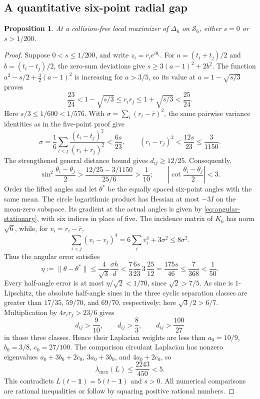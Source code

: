 \documentclass[11pt]{article}
\newtheorem{proposition}[theorem]{Proposition}
\theoremstyle{remark}
\newcommand{\one}{\mathbf 1}
\newcommand{\norm}[1]{\lVert#1\rVert}
\numberwithin{equation}{section}
\begin{document}
\subsection{A quantitative six-point radial gap}
\begin{proposition}\label{prop:six-gap}
At a collision-free local maximizer of $\Delta_6$ on $\mathcal S_6$,
either $s=0$ or $s>1/200$.
\end{proposition}
\begin{proof}
Suppose $0<s\le1/200$, and write $z_i=r_i e^{i\theta_i}$.
For $a=(t_i+t_j)/2$ and $b=(t_i-t_j)/2$, the zero-sum deviations give
$s\ge3(a-1)^2+2b^2$.
The function $a^2-s/2+\frac32(a-1)^2$ is increasing for $a>3/5$,
so its value at $a=1-\sqrt{s/3}$ proves
\[
 \frac{23}{24}<1-\sqrt{s/3}\le r_ir_j
 \le1+\sqrt{s/3}<\frac{25}{24}.
\]
Here $s/3\le1/600<1/576$.
With $\sigma=\sum_i(r_i-\overline r)^2$, the same pairwise variance
identities as in the five-point proof give
\[
 \sigma=\frac16\sum_{i<j}
       \frac{(t_i-t_j)^2}{(r_i+r_j)^2}<\frac{6s}{23},
 \qquad (r_i-r_j)^2<\frac{12s}{23}\le\frac3{1150}.
\]
The strengthened general distance bound gives $d_{ij}\ge12/25$.
Consequently,
\[
 \sin^2\frac{\theta_i-\theta_j}{2}
 >\frac{12/25-3/1150}{25/6}>\frac1{10};
 \qquad \left|\cot\frac{\theta_i-\theta_j}{2}\right|<3.
\]
Order the lifted angles and let $\theta^*$ be the equally spaced
six-point angles with the same mean. The circle logarithmic product
has Hessian at most $-3I$ on the mean-zero subspace. Its gradient
at the actual angles is given by \eqref{eq:angular-stationary}, with
six indices in place of five. The incidence matrix of $K_6$ has norm
$\sqrt6$, while, for $v_i=r_i-\overline r$,
\[
 \sum_{i<j}(v_i-v_j)^4
 =6\sum_i v_i^4+3\sigma^2\le8\sigma^2.
\]
Thus the angular error satisfies
\[
 \eta:=\norm{\theta-\theta^*}
 \le\frac4{\sqrt3}\frac{\sigma h}{d}
 <\frac73\frac{6s}{23}\,3\,\frac{25}{12}
 =\frac{175s}{46}\le\frac7{368}<\frac1{50}.
\]
Every half-angle error is at most $\eta/\sqrt2<1/70$, since
$\sqrt2>7/5$.
As sine is $1$-Lipschitz, the absolute half-angle sines in the three
cyclic separation classes are greater than $17/35$, $59/70$, and
$69/70$, respectively; here $\sqrt3/2>6/7$.
Multiplication by $4r_ir_j>23/6$ gives
\[
 d_{ij}>\frac{9}{10},\qquad d_{ij}>\frac83,\qquad
 d_{ij}>\frac{100}{27}
\]
in those three classes. Hence their Laplacian weights are less than
$a_0=10/9$, $b_0=3/8$, $c_0=27/100$.
The comparison circulant Laplacian has nonzero eigenvalues
$a_0+3b_0+2c_0$, $3a_0+3b_0$, and $4a_0+2c_0$, so
\[
 \lambda_{\max}(L)\le\frac{2243}{450}<5.
\]
This contradicts $L(t-\one)=5(t-\one)$ and $s>0$.
All numerical comparisons are rational inequalities or follow by
squaring positive rational numbers.
\end{proof}
\end{document}
